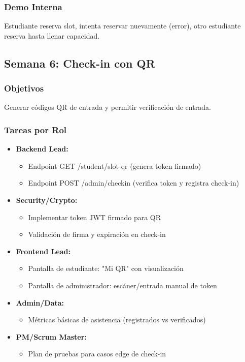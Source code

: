 \documentclass[12pt,a4paper]{article}
\begin{document}
\subsubsection{Demo Interna}
Estudiante reserva slot, intenta reservar nuevamente (error), otro estudiante reserva hasta llenar capacidad.

\subsection{Semana 6: Check-in con QR}

\subsubsection{Objetivos}
Generar códigos QR de entrada y permitir verificación de entrada.

\subsubsection{Tareas por Rol}

\begin{itemize}[leftmargin=*]
    \item \textbf{Backend Lead:}
    \begin{itemize}
        \item Endpoint GET /student/slot-qr (genera token firmado)
        \item Endpoint POST /admin/checkin (verifica token y registra check-in)
    \end{itemize}
    
    \item \textbf{Security/Crypto:}
    \begin{itemize}
        \item Implementar token JWT firmado para QR
        \item Validación de firma y expiración en check-in
    \end{itemize}
    
    \item \textbf{Frontend Lead:}
    \begin{itemize}
        \item Pantalla de estudiante: "Mi QR" con visualización
        \item Pantalla de administrador: escáner/entrada manual de token
    \end{itemize}
    
    \item \textbf{Admin/Data:}
    \begin{itemize}
        \item Métricas básicas de asistencia (registrados vs verificados)
    \end{itemize}
    
    \item \textbf{PM/Scrum Master:}
    \begin{itemize}
        \item Plan de pruebas para casos edge de check-in
    \end{itemize}
\end{itemize}
\end{document}
